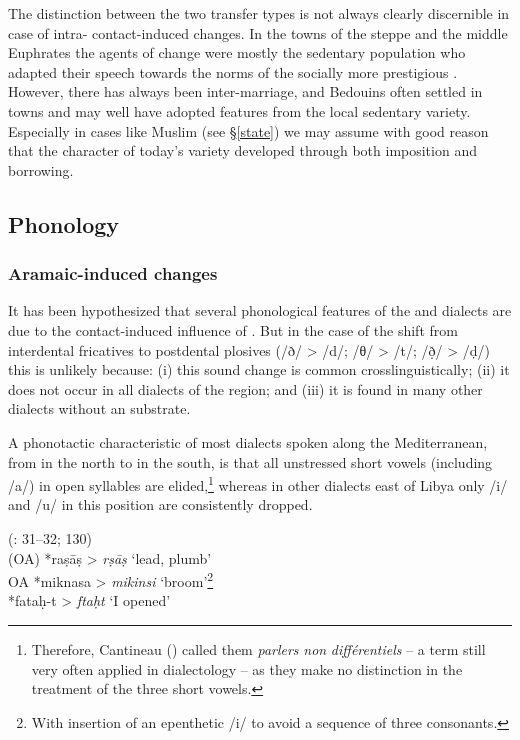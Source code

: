 \documentclass[output=paper]{langsci/langscibook}
\begin{document}
The distinction between the two {transfer} types is not always clearly discernible in case of intra- contact-induced changes. In the towns of the  steppe and the middle Euphrates the agents of change were mostly the sedentary population who adapted their speech towards the norms of the socially more {prestigious} . However, there has always been inter-marriage, and Bedouins often settled in towns and may well have adopted features from the local sedentary variety. Especially in cases like Muslim  (see §\ref{state}) we may assume with good reason that the  character of today’s variety developed through both {imposition} and borrowing. 

  \subsection{Phonology} 
 \subsubsection{Aramaic-induced changes} 

It has been hypothesized that several phonological features of the  and  dialects are due to the contact-induced influence of . But in the case of the shift from interdental fricatives to postdental plosives (/ð/ > /d/; /θ/ > /t/; /ð̣/ > /ḍ/) this is unlikely because: (i) this sound change is common crosslinguistically; (ii) it does not occur in all dialects of the region; and (iii) it is found in many other  dialects without an  {substrate}. 

A phonotactic characteristic of most dialects spoken along the Mediterranean, from  in the north to  in the south, is that all unstressed short vowels (including /a/) in open syllables are elided,\footnote{Therefore, Cantineau (\citeyear[108]{Cantineau1960book}) called them \textit{parlers} \textit{non} \textit{différentiels} – a term still very often applied in  dialectology – as they make no distinction in the treatment of the three short vowels.} whereas in other dialects east of Libya only /i/ and /u/ in this position are consistently dropped.

\ea
{  (\citealt{Procházka2002Cukurova}: 31--32; 130)}\\
  \textup{  (OA)} *raṣāṣ > \textit{rṣāṣ}  \textup{‘lead, plumb’\\
OA} *miknasa > \textit{mikinsi} ‘\textup{broom’}\footnote{With insertion of an epenthetic /i/ to avoid a sequence of three consonants.}\\
*fataḥ-t > \textit{ftaḥt} ‘\textup{I opened’}\\
  \z
  
\end{document}
